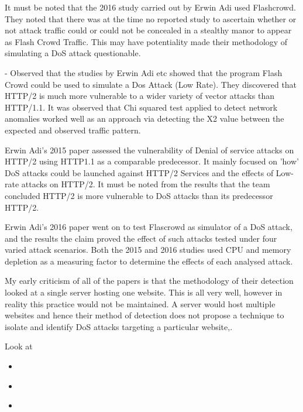 It must be noted that the 2016 study carried out by Erwin Adi used Flashcrowd. They noted that there was at the time no reported study to ascertain whether or not attack traffic could or could not be concealed in a stealthy manor to appear as Flash Crowd Traffic. This may have potentiality made their methodology of simulating a DoS attack questionable.

\cite{tripathi2018slow} - Observed that the studies by Erwin Adi etc showed that the program Flash Crowd could be used to simulate a Dos Attack (Low Rate). They discovered that HTTP/2 is much more vulnerable to a wider variety of vector attacks than HTTP/1.1. It was observed that Chi squared test applied to detect network anomalies worked well as an approach via detecting the X2 value between the expected and observed traffic pattern.

Erwin Adi's 2015 paper assessed the vulnerability of Denial of service attacks on HTTP/2 using HTTP1.1 as a comparable predecessor.  It mainly focused on 'how' DoS attacks could be launched against HTTP/2 Services and the effects of Low-rate attacks on HTTP/2. It must be noted from the results that the team concluded HTTP/2 is more vulnerable to DoS attacks than its predecessor HTTP/2.

Erwin Adi's 2016 paper went on to test Flascrowd as simulator of a DoS attack, and the results the claim proved the effect of such attacks tested under four varied attack scenarios. Both the 2015 and 2016 studies used CPU and memory depletion as a measuring factor to determine the effects of each analysed attack.

My early criticism of all of the papers is that the methodology of their detection looked at a single server hosting one website. This is all very well, however in reality this practice would not be maintained. A server would host multiple websites and hence their method of detection does not propose a technique to isolate and identify DoS attacks targeting a particular website,.

Look at
\begin{itemize}
    \item \cite{tripathi2016secure}
    \item \cite{aiello2014line}
    \item \cite{tripathi2018slow}
\end{itemize}